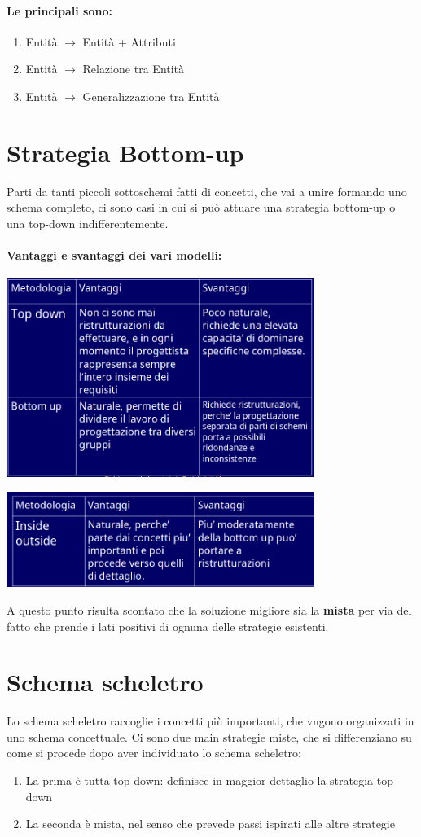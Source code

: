 \documentclass[12pt, a4paper, openany, twoside]{book}
\begin{document}
\paragraph{Le principali sono:}
\begin{enumerate}
	\item Entità $\to$ Entità + Attributi
	\item Entità $\to$ Relazione tra Entità
	\item Entità $\to$ Generalizzazione tra Entità
\end{enumerate}
\section{Strategia Bottom-up}
Parti da tanti piccoli sottoschemi fatti di concetti, che vai a unire formando
uno schema completo, ci sono casi in cui si può attuare una strategia bottom-up
o una top-down indifferentemente.
\paragraph{Vantaggi e svantaggi dei vari modelli:}
\begin{center}
\includegraphics[width=0.75\textwidth]{8}
\end{center}
\begin{center}
\includegraphics[width=0.75\textwidth]{9}
\end{center}
A questo punto risulta scontato che la soluzione migliore sia la \textbf{mista}
per via del fatto che prende i lati positivi di ognuna delle strategie esistenti.
\section{Schema scheletro}
Lo schema scheletro raccoglie i concetti più importanti, che vngono organizzati
in uno schema concettuale. 
Ci sono due main strategie miste, che si differenziano su come si procede dopo
aver individuato lo schema scheletro:
\begin{enumerate}
	\item La prima è tutta top-down: definisce in maggior dettaglio la strategia
	top-down
	\item La seconda è mista, nel senso che prevede passi ispirati alle altre
	strategie
\end{enumerate}
\end{document}
